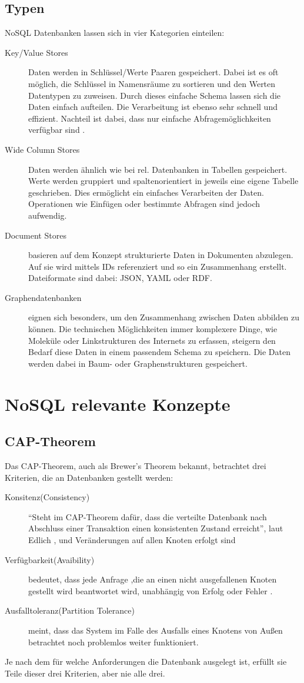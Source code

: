 \documentclass[a4paper,11pt,oneside,%
headsepline,												%
footsepline,												%
bibtotocnumbered									%
]{scrreprt}
\begin{document}
\subsection{Typen}
NoSQL Datenbanken lassen sich in vier Kategorien einteilen:
\begin{description}
   \item[Key/Value Stores] Daten werden in Schlüssel/Werte Paaren gespeichert. Dabei ist es oft möglich, die Schlüssel in Namensräume zu sortieren und den Werten Datentypen zu zuweisen. Durch dieses einfache Schema lassen sich die Daten einfach aufteilen. Die Verarbeitung ist ebenso sehr schnell und effizient. Nachteil ist dabei, dass nur einfache Abfragemöglichkeiten verfügbar sind \autocite[131]{Edlich2010}.
   \item[Wide Column Stores] Daten werden ähnlich wie bei rel. Datenbanken in Tabellen gespeichert. Werte werden gruppiert und spaltenorientiert in jeweils eine eigene Tabelle geschrieben. Dies ermöglicht ein einfaches Verarbeiten der Daten. Operationen wie Einfügen oder bestimmte Abfragen sind jedoch aufwendig.
   \item[Document Stores] basieren auf dem Konzept strukturierte Daten in Dokumenten abzulegen. Auf sie wird mittels IDs referenziert und so ein Zusammenhang erstellt. Dateiformate sind dabei: JSON, YAML oder RDF.
   \item[Graphendatenbanken] eignen sich besonders, um den Zusammenhang zwischen Daten abbilden zu können. Die technischen Möglichkeiten immer komplexere Dinge, wie Moleküle oder Linkstrukturen des Internets zu erfassen, steigern den Bedarf diese Daten in einem passendem Schema zu speichern. Die Daten werden dabei in Baum- oder Graphenstrukturen gespeichert.
\end{description}

\section{NoSQL relevante Konzepte}
\subsection{CAP-Theorem}
\label{CAP}
Das CAP-Theorem, auch als Brewer's Theorem bekannt, betrachtet drei Kriterien, die an Datenbanken gestellt werden:
\begin{description}
\item[Konsitenz(Consistency)] \enquote{Steht im CAP-Theorem dafür, dass die verteilte Datenbank nach Abschluss einer Transaktion einen konsistenten Zustand erreicht}, laut Edlich \autocite[31]{Edlich2010}, und Veränderungen auf allen Knoten erfolgt sind
\item[Verfügbarkeit(Avaibility)] bedeutet, dass jede Anfrage ,die an einen nicht ausgefallenen Knoten gestellt wird beantwortet wird, unabhängig von Erfolg oder Fehler \autocite[54]{Fowler2013}.
\item[Ausfalltoleranz(Partition Tolerance)] meint, dass das System im Falle des Ausfalls eines Knotens von Außen betrachtet noch problemlos weiter funktioniert.
\end{description}
Je nach dem für welche Anforderungen die Datenbank ausgelegt ist, erfüllt sie Teile dieser drei Kriterien, aber nie alle drei. 
\end{document}
